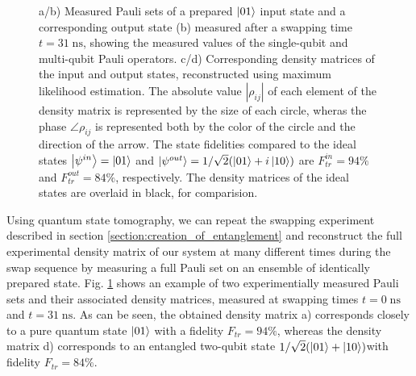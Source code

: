 \begin{figure}[ht!]
\begin{tabular}{ll}
	\end{tabular}
	\caption[]{a/b) Measured Pauli sets of a prepared $\left| 01 \right>$ input state and a corresponding output state (b) measured after a swapping time $t=31\;\mathrm{ns}$, showing the measured values of the single-qubit and multi-qubit Pauli operators. c/d) Corresponding density matrices of the input and output states, reconstructed using maximum likelihood estimation. The absolute value $|\rho_{ij}|$ of each element of the density matrix is represented by the size of each circle, wheras the phase $\angle \rho_{ij}$ is represented both by the color of the circle and the direction of the arrow. The state fidelities compared to the ideal states $\left| \psi^{in} \right>=\left| 01 \right>$ and $\left| \psi^{out} \right>=1/\sqrt{2}(\left| 01 \right>+i\left| 10 \right>)$ are $F^{in}_{tr}=94\%$ and $F^{out}_{tr}=84\%$, respectively. The density matrices of the ideal states are overlaid in black, for comparision.}
	\label{fig:pauli_set_example}
\end{figure}

Using quantum state tomography, we can repeat the swapping experiment described in section \ref{section:creation_of_entanglement} and reconstruct the full experimental density matrix of our system at many different times during the swap sequence by measuring a full Pauli set on an ensemble of identically prepared state. Fig. \ref{fig:pauli_set_example} shows an example of two experimentially measured Pauli sets and their associated density matrices, measured at swapping times $t=0\;\mathrm{ns}$ and $t= 31\;\mathrm{ns}$. As can be seen, the obtained density matrix a) corresponds closely to a pure quantum state $\left| 01 \right>$ with a fidelity $F_{tr}=94\%$, whereas the density matrix d) corresponds to an entangled two-qubit state $1/\sqrt{2}(\left| 01 \right>+\left| 10 \right>)$with fidelity $F_{tr}=84\%$. 

\smallskip

